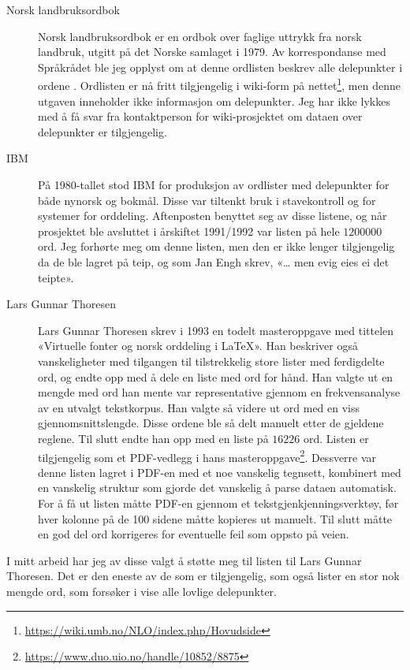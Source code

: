 \begin{description}
\item[Norsk landbruksordbok]	Norsk landbruksordbok er en ordbok over faglige uttrykk fra norsk landbruk, utgitt på det Norske samlaget i 1979. Av korrespondanse med Språkrådet ble jeg opplyst om at denne ordlisten beskrev alle delepunkter i ordene . Ordlisten er nå fritt tilgjengelig i wiki-form på nettet\footnote{\url{https://wiki.umb.no/NLO/index.php/Hovudside}}, men denne utgaven inneholder ikke informasjon om delepunkter. Jeg har ikke lykkes med å få svar fra kontaktperson for wiki-prosjektet om dataen over delepunkter er tilgjengelig. 
\item[IBM] 	På 1980-tallet stod IBM for produksjon av ordlister med delepunkter for både nynorsk og bokmål. Disse var tiltenkt bruk i stavekontroll og for systemer for orddeling. Aftenposten benyttet seg av disse listene, og når prosjektet ble avsluttet i årskiftet 1991/1992 var listen på hele $1200000$ ord. \cite{jan-engh} Jeg forhørte meg om denne listen, men den er ikke lenger tilgjengelig da de ble lagret på teip, og som Jan Engh skrev, «… men evig eies ei det teipte».
\item[Lars Gunnar Thoresen]		Lars Gunnar Thoresen skrev i 1993 en todelt masteroppgave med tittelen «Virtuelle fonter og norsk orddeling i \LaTeX{}». Han beskriver også vanskeligheter med tilgangen til tilstrekkelig store lister med ferdigdelte ord, og endte opp med å dele en liste med ord for hånd. Han valgte ut en mengde med ord han mente var representative gjennom en frekvensanalyse av en utvalgt tekstkorpus. Han valgte så videre ut ord med en viss gjennomsnittslengde. Disse ordene ble så delt manuelt etter de gjeldene reglene. Til slutt endte han opp med en liste på  $16226$ ord. \cite{thoresen1993virtuelle} Listen er tilgjengelig som et PDF-vedlegg i hans masteroppgave\footnote{\url{https://www.duo.uio.no/handle/10852/8875}}. Dessverre var denne listen lagret i PDF-en med et noe vanskelig tegnsett, kombinert med en vanskelig struktur som gjorde det vanskelig å parse dataen automatisk. For å få ut listen måtte PDF-en gjennom et tekstgjenkjenningsverktøy, før hver kolonne på de 100 sidene måtte kopieres ut manuelt. Til slutt måtte en god del ord korrigeres for eventuelle feil som oppsto på veien.
\end{description}

I mitt arbeid har jeg av disse valgt å støtte meg til listen til Lars Gunnar Thoresen. Det er den eneste av de som er tilgjengelig, som også lister en stor nok mengde ord, som forsøker i vise alle lovlige delepunkter.

